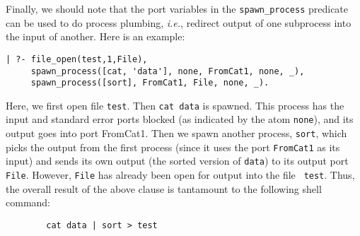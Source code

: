 Finally, we should note that the port variables in the
\verb|spawn_process| predicate can be used to do process plumbing, {\it
  i.e.}, redirect output of one subprocess into the input of another. Here
is an example:
\begin{verbatim}
| ?- file_open(test,1,File),
     spawn_process([cat, 'data'], none, FromCat1, none, _),
     spawn_process([sort], FromCat1, File, none, _).  
\end{verbatim}
Here, we first open file {\tt test}. Then \verb|cat data| is spawned.  This
process has the input and standard error ports blocked (as indicated by the
atom {\tt none}), and its output goes into port FromCat1.  Then we spawn
another process, {\tt sort}, which picks the output from the first process
(since it uses the port {\tt FromCat1} as its input) and sends its own
output (the sorted version of {\tt data}) to its output port {\tt File}.
However, {\tt File} has already been open for output into the file {\tt
  test}. Thus, the overall result of the above clause is tantamount to the
following shell command:
\begin{verbatim}
        cat data | sort > test  
\end{verbatim}

